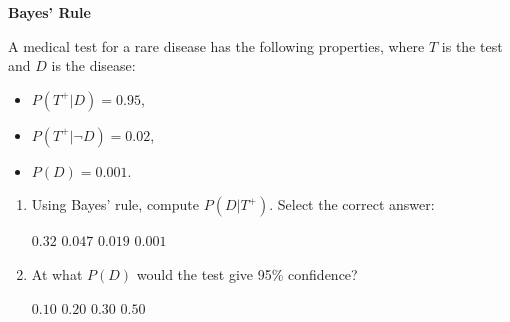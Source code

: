 \documentclass[12pt,letterpaper, onecolumn]{exam}
\begin{document}
\begin{questions}
\begin{solution}
\begin{parts}
        \part 
        \part 
        \part 
        \part 
    \end{parts}
\end{solution}

\question[10 points]\textbf{Bayes' Rule}\droppoints

A medical test for a rare disease has the following properties, where $T$ is the test and $D$ is the disease:
\begin{itemize}
    \item \( P(T^+ | D) = 0.95 \),
    \item \( P(T^+ | \neg D) = 0.02 \),
    \item \( P(D) = 0.001 \).
\end{itemize}

\begin{enumerate}[label=(\alph*)]
    \item Using Bayes’ rule, compute \( P(D | T^+) \). Select the correct answer:
    \begin{choices}
        \choice \( 0.32 \)
        \choice \( 0.047 \)
        \choice \( 0.019 \)
        \choice \( 0.001 \)
    \end{choices}
    \item At what $P(D)$ would the test give 95\% confidence?
    \begin{choices}
        \choice $0.10$
        \choice $0.20$
        \choice $0.30$
        \choice $0.50$
    \end{choices}
\end{enumerate}

\begin{solution}
    \begin{parts}
        \part 
        \part 
    \end{parts}
\end{solution}


\end{questions}
\end{document}
